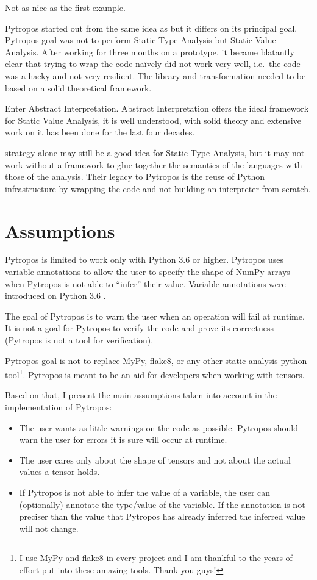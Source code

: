 \documentclass[
11pt, %
english, %
singlespacing, %
headsepline, %
]{MastersDoctoralThesis} %
\providecommand{\tightlist}{%
  \setlength{\itemsep}{0pt}\setlength{\parskip}{0pt}}
\begin{document}
Not as nice as the first example.

Pytropos started out from the same idea as \textcite{ortin_towards_2015}
but it differs on its principal goal. Pytropos goal was not to perform
Static Type Analysis but Static Value Analysis. After working for three
months on a prototype, it became blatantly clear that trying to wrap the
code naïvely did not work very well, i.e.~the code was a hacky and not
very resilient. The library and transformation needed to be based on a
solid theoretical framework.

Enter Abstract Interpretation. Abstract Interpretation offers the ideal
framework for Static Value Analysis, it is well understood, with solid
theory and extensive work on it has been done for the last four decades.

\textcite{ortin_towards_2015} strategy alone may still be a good idea
for Static Type Analysis, but it may not work without a framework to
glue together the semantics of the languages with those of the analysis.
Their legacy to Pytropos is the reuse of Python infrastructure by
wrapping the code and not building an interpreter from scratch.

\hypertarget{assumptions}{%
\section{Assumptions}\label{assumptions}}

Pytropos is limited to work only with Python 3.6 or higher. Pytropos
uses variable annotations to allow the user to specify the shape of
NumPy arrays when Pytropos is not able to \enquote{infer} their value.
Variable annotations were introduced on Python 3.6 \autocite{pep526}.

The goal of Pytropos is to warn the user when an operation will fail at
runtime. It is not a goal for Pytropos to verify the code and prove its
correctness (Pytropos is not a tool for verification).

Pytropos goal is not to replace MyPy, flake8, or any other static
analysis python tool\footnote{I use MyPy and flake8 in every project and
  I am thankful to the years of effort put into these amazing tools.
  Thank you guys!}. Pytropos is meant to be an aid for developers when
working with tensors.

Based on that, I present the main assumptions taken into account in the
implementation of Pytropos:

\begin{itemize}
\tightlist
\item
  The user wants as little warnings on the code as possible. Pytropos
  should warn the user for errors it is sure will occur at runtime.
\item
  The user cares only about the shape of tensors and not about the
  actual values a tensor holds.
\item
  If Pytropos is not able to infer the value of a variable, the user can
  (optionally) annotate the type/value of the variable. If the
  annotation is not preciser than the value that Pytropos has already
  inferred the inferred value will not change.
\end{itemize}
\end{document}
